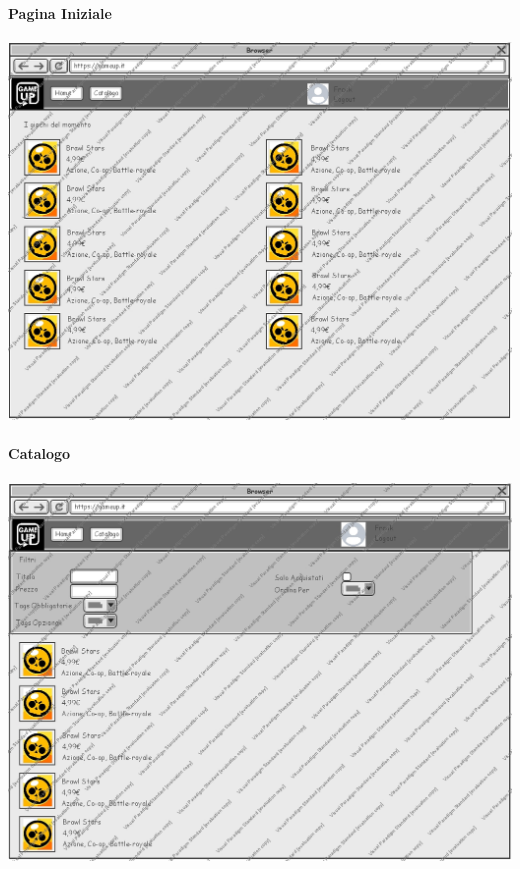 \paragraph{Pagina Iniziale}
\begin{center}
\includegraphics[width=\textwidth,height=\textheight,keepaspectratio]{Figure/Mockups/PaginaIniziale.jpg}
\end{center}

\newpage
\paragraph{Catalogo}
\begin{center}
\includegraphics[width=\textwidth,height=\textheight,keepaspectratio]{Figure/Mockups/Catalogo.jpg}
\end{center}

